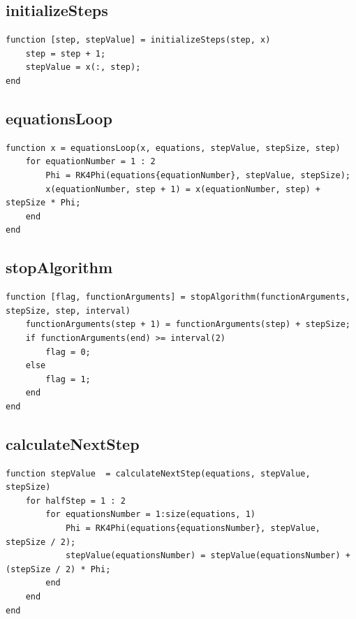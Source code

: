 \subsection{initializeSteps}
\begin{simplechar}
\begin{lstlisting}
function [step, stepValue] = initializeSteps(step, x)
    step = step + 1;
    stepValue = x(:, step);
end
\end{lstlisting}
\end{simplechar}

\subsection{equationsLoop}
\begin{simplechar}
\begin{lstlisting}
function x = equationsLoop(x, equations, stepValue, stepSize, step)
    for equationNumber = 1 : 2
        Phi = RK4Phi(equations{equationNumber}, stepValue, stepSize);
        x(equationNumber, step + 1) = x(equationNumber, step) + stepSize * Phi;
    end
end

\end{lstlisting}
\end{simplechar}

\subsection{stopAlgorithm}
\begin{simplechar}
\begin{lstlisting}
function [flag, functionArguments] = stopAlgorithm(functionArguments, stepSize, step, interval)
    functionArguments(step + 1) = functionArguments(step) + stepSize;
    if functionArguments(end) >= interval(2)
        flag = 0;
    else
        flag = 1;
    end
end
\end{lstlisting}
\end{simplechar}

\subsection{calculateNextStep}
\begin{simplechar}
\begin{lstlisting}
function stepValue  = calculateNextStep(equations, stepValue, stepSize)
    for halfStep = 1 : 2
        for equationsNumber = 1:size(equations, 1)
            Phi = RK4Phi(equations{equationsNumber}, stepValue, stepSize / 2);
            stepValue(equationsNumber) = stepValue(equationsNumber) + (stepSize / 2) * Phi;
        end
    end
end

\end{lstlisting}
\end{simplechar}

